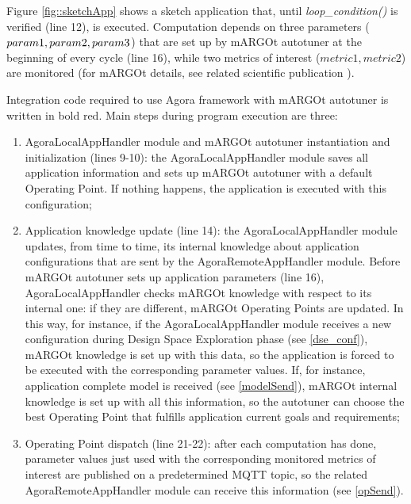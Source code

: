 Figure \ref{fig::sketchApp} shows a sketch application that, until \textit{loop\_con\-di\-tion()} is verified (line 12), is executed. Computation depends on three parameters ($pa\-ram1, pa\-ram2, pa\-ram3$) that are set up by mARGOt autotuner at the beginning of every cycle (line 16), while two metrics of interest ($metric1, metric2$) are monitored (for mARGOt details, see related scientific publication \cite{gadioli2015application}).

Integration code required to use Agora framework with mARGOt autotuner is written in bold red. Main steps during program execution are three:

\begin{enumerate}

    \item AgoraLocalAppHandler module and mARGOt autotuner instantiation and initialization (lines 9-10): the AgoraLocalAppHandler module saves all application information and sets up mARGOt autotuner with a default Operating Point. If nothing happens, the application is executed with this configuration;
    
    \item Application knowledge update (line 14): the AgoraLocalAppHandler module updates, from time to time, its internal knowledge about application configurations that are sent by the AgoraRemoteAppHandler module. Before mARGOt autotuner sets up application parameters (line 16), AgoraLocalAppHandler checks mARGOt knowledge with respect to its internal one: if they are different, mARGOt Operating Points are updated. In this way, for instance, if the AgoraLocalAppHandler module receives a new configuration during Design Space Exploration phase (see \ref{dse_conf}), mARGOt knowledge is set up with this data, so the application is forced to be executed with the corresponding parameter values. If, for instance, application complete model is received (see \ref{modelSend}), mARGOt internal knowledge is set up with all this information, so the autotuner can choose the best Operating Point that fulfills application current goals and requirements;
    
    \item Operating Point dispatch (line 21-22): after each computation has done, parameter values just used with the corresponding monitored metrics of interest are published on a predetermined MQTT topic, so the related AgoraRemoteAppHandler module can receive this information (see \ref{opSend}).
    
\end{enumerate}
